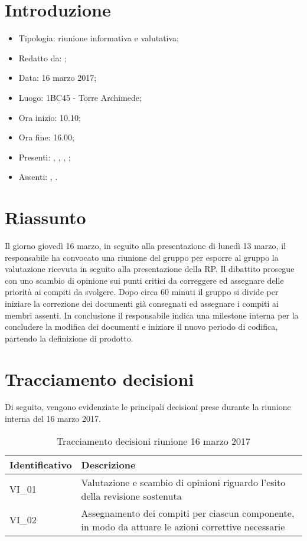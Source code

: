 \section{Introduzione}

	\begin{itemize}
		\item Tipologia: riunione informativa e valutativa;
		\item Redatto da: \NS;
		\item Data: 16 marzo 2017;
		\item Luogo: 1BC45 - Torre Archimede;
		\item Ora inizio: 10.10;
		\item Ora fine: 16.00;
		\item Presenti: \AS, \DS, \NS, \DAN;	
		\item Assenti: \MC, \AN.
	\end{itemize}

\section{Riassunto}
Il giorno giovedì 16 marzo, in seguito alla presentazione di lunedì 13 marzo, il responsabile ha convocato una riunione del gruppo per esporre al gruppo la valutazione ricevuta in seguito alla presentazione della RP. 
Il dibattito prosegue con uno scambio di opinione sui punti critici da correggere ed assegnare delle priorità ai compiti da svolgere. Dopo circa 60 minuti il gruppo si divide per iniziare la correzione dei documenti già consegnati ed assegnare i compiti ai membri assenti.
In conclusione il responsabile indica una milestone interna per la concludere la modifica dei documenti e iniziare il nuovo periodo di codifica, partendo la definizione di prodotto.

\section{Tracciamento decisioni}
Di seguito, vengono evidenziate le principali decisioni prese durante la riunione interna del 16 marzo 2017.

\begin{table}[H]
	\begin{center}
		\begin{tabular}{|p{3cm}| p{11cm}|}
			\hline
			\textbf{Identificativo}	& \textbf{Descrizione} \\
			\hline
			VI\_01	& Valutazione e scambio di opinioni riguardo l'esito della revisione sostenuta	\\
			\hline
			VI\_02 & Assegnamento dei compiti per ciascun componente, in modo da attuare le azioni correttive necessarie\\
			\hline
		\end{tabular}
		\caption{Tracciamento decisioni riunione 16 marzo 2017}
	\end{center}
\end{table}
